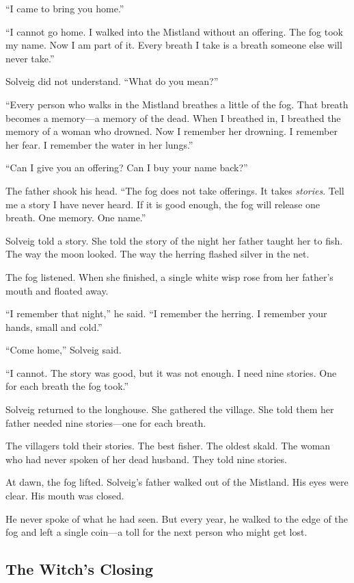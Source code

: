 \documentclass[9pt,a5paper]{extbook}
\begin{document}
``I came to bring you home.''

``I cannot go home. I walked into the Mistland without an offering. The fog took my name. Now I am part of it. Every breath I take is a breath someone else will never take.''

Solveig did not understand. ``What do you mean?''

``Every person who walks in the Mistland breathes a little of the fog. That breath becomes a memory---a memory of the dead. When I breathed in, I breathed the memory of a woman who drowned. Now I remember her drowning. I remember her fear. I remember the water in her lungs.''

``Can I give you an offering? Can I buy your name back?''

The father shook his head. ``The fog does not take offerings. It takes \textit{stories}. Tell me a story I have never heard. If it is good enough, the fog will release one breath. One memory. One name.''

Solveig told a story. She told the story of the night her father taught her to fish. The way the moon looked. The way the herring flashed silver in the net.

The fog listened. When she finished, a single white wisp rose from her father's mouth and floated away.

``I remember that night,'' he said. ``I remember the herring. I remember your hands, small and cold.''

``Come home,'' Solveig said.

``I cannot. The story was good, but it was not enough. I need nine stories. One for each breath the fog took.''

Solveig returned to the longhouse. She gathered the village. She told them her father needed nine stories---one for each breath.

The villagers told their stories. The best fisher. The oldest skald. The woman who had never spoken of her dead husband. They told nine stories.

At dawn, the fog lifted. Solveig's father walked out of the Mistland. His eyes were clear. His mouth was closed.

He never spoke of what he had seen. But every year, he walked to the edge of the fog and left a single coin---a toll for the next person who might get lost.

\subsection*{The Witch's Closing}
\end{document}
